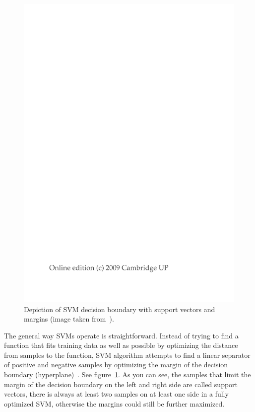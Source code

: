 \begin{figure}[htbp]
    \centering
        \includegraphics[page=3,trim=5.5cm 16cm 4cm 6.5cm,clip,width=\textwidth]{./images/external/intro-ir-svm.pdf}
    \caption{Depiction of SVM decision boundary with support vectors and margins (image taken from~\cite{manning2008introduction}).}
    \label{fig:background.svm.decision.intro}
\end{figure}

The general way SVMs operate is straightforward. Instead of trying to find a function that fits training data as well as possible by optimizing the distance from samples to the function, SVM algorithm attempts to find a linear separator of positive and negative samples by optimizing the margin of the decision boundary (hyperplane)~\cite{manning2008introduction}. See figure~\ref{fig:background.svm.decision.intro}. As you can see, the samples that limit the margin of the decision boundary on the left and right side are called support vectors, there is always at least two samples on at least one side in a fully optimized SVM, otherwise the margins could still be further maximized.

